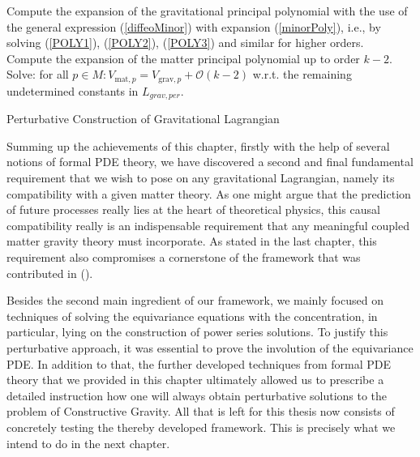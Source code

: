 \begin{algorithm}[hbt!]
Compute the expansion of the gravitational principal polynomial with the use of the general expression (\ref{diffeoMinor}) with expansion (\ref{minorPoly}), i.e., by solving (\ref{POLY1}), (\ref{POLY2}), (\ref{POLY3}) and similar for higher orders. \\
Compute the expansion of the matter principal polynomial up to order $k-2$.\\
Solve: for all $p\in M : V_{\text{mat},p} = V_{\text{grav},p} + \mathcal{O}(k-2)$ w.r.t. the remaining undetermined constants in $L_{grav,per}$.
 \caption{Perturbative Construction of Gravitational Lagrangian}\label{Algo2}
\end{algorithm}

Summing up the achievements of this chapter, firstly with the help of several notions of formal PDE theory, we have discovered a second and final fundamental requirement that we wish to pose on any gravitational Lagrangian, namely its compatibility with a given matter theory. As one might argue that the prediction of future processes really lies at the heart of theoretical physics, this causal compatibility really is an indispensable requirement that any meaningful coupled matter gravity theory must incorporate. As stated in the last chapter, this requirement also compromises a cornerstone of the framework that was contributed in (\cite{2018PhRvD..97h4036D}). 

Besides the second main ingredient of our framework, we mainly focused on techniques of solving the equivariance equations with the concentration, in particular, lying on the construction of power series solutions. To justify this perturbative approach, it was essential to prove the involution of the equivariance PDE. In addition to that, the further developed techniques from formal PDE theory that we provided in this chapter ultimately allowed us to prescribe a detailed instruction how one will always obtain perturbative solutions to the problem of Constructive Gravity.  All that is left for this thesis now consists of concretely testing the thereby developed framework. This is precisely what we intend to do in the next chapter.
